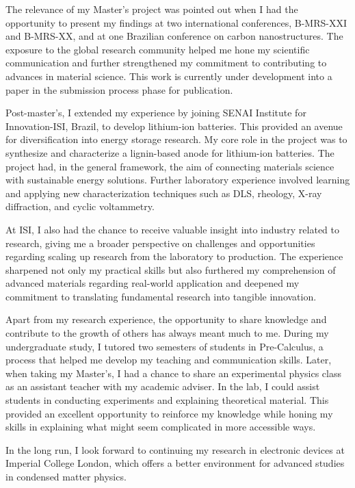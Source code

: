 \documentclass[12pt]{article}
\begin{document}
The relevance of my Master's project was pointed out when I had the opportunity to present my findings at two international conferences, B-MRS-XXI and B-MRS-XX, and at one Brazilian conference on carbon nanostructures. The exposure to the global research community helped me hone my scientific communication and further strengthened my commitment to contributing to advances in material science. This work is currently under development into a paper in the submission process phase for publication.

Post-master's, I extended my experience by joining SENAI Institute for Innovation-ISI, Brazil, to develop lithium-ion batteries. This provided an avenue for diversification into energy storage research. My core role in the project was to synthesize and characterize a lignin-based anode for lithium-ion batteries. The project had, in the general framework, the aim of connecting materials science with sustainable energy solutions. Further laboratory experience involved learning and applying new characterization techniques such as DLS, rheology, X-ray diffraction, and cyclic voltammetry.

At ISI, I also had the chance to receive valuable insight into industry related to research, giving me a broader perspective on challenges and opportunities regarding scaling up research from the laboratory to production. The experience sharpened not only my practical skills but also furthered my comprehension of advanced materials regarding real-world application and deepened my commitment to translating fundamental research into tangible innovation.

Apart from my research experience, the opportunity to share knowledge and contribute to the growth of others has always meant much to me. During my undergraduate study, I tutored two semesters of students in Pre-Calculus, a process that helped me develop my teaching and communication skills. Later, when taking my Master's, I had a chance to share an experimental physics class as an assistant teacher with my academic adviser. In the lab, I could assist students in conducting experiments and explaining theoretical material. This provided an excellent opportunity to reinforce my knowledge while honing my skills in explaining what might seem complicated in more accessible ways.

In the long run, I look forward to continuing my research in electronic devices at Imperial College London, which offers a better environment for advanced studies in condensed matter physics. 
\end{document}
